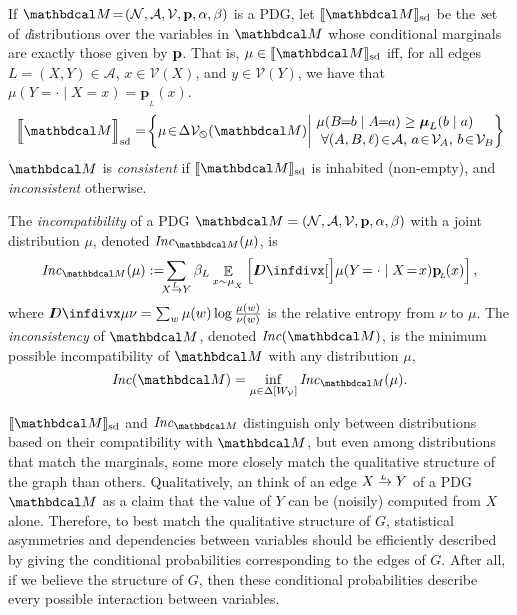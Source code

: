 \documentclass{article}
\newcommand{\bp}[1][L]{\mathbf{p}_{\!_#1\!}}
\newcommand{\V}{\mathcal V}
\newcommand{\Ed}{\mathcal A}
\newcommand{\ed}[3]{#2
	\overset{\smash{\mskip-5mu\raisebox{-1pt}{$\scriptscriptstyle
				#1$}}}{\rightarrow} #3}
\newcommand{\alle}[1][L]{_{ \ed {#1}XY}}
\newcommand{\dg}[1]{\mathbdcal #1}
\DeclarePairedDelimiter{\SD}{\llbracket}{\rrbracket_{\text{sd}}}
\newcommand\Inc{\mathit{Inc}}
\newcommand{\none}{\varobslash}
\begin{document}
	\begin{defn} \label{def:set-semantics} 
		If $\dg M\!=\!\pdgvars[]$ is a PDG, let $\SD{\dg M}$ be the \emph{s}et of \emph{d}istributions over the variables in $\dg M$ whose conditional marginals are exactly those given by $\mathbf p$.
		That is, $\mu \in \SD{\dg M}$ iff, for all edges $L = (X,Y) \in \Ed$,  $x \in \V(X)$,  and $y \in \V(Y)$, we have that $\mu(Y = \cdot \mid X\!=\! x) = \bp(x)$.
		{
			\[ \SD[\Big]{\dg M} = \!\left\{\mu \!\in\! \Delta \V_\none (\dg M) \middle|\!
			\begin{array}{l}
				\mu(B\!\! =\!\!b \mid A\!\!=\!\!a) \geq \boldsymbol\mu_L(b \mid a) \\[0.1em]
				~\text{$\forall (A, B,\ell) \!\in\! \Ed$, $a \!\in\!\mathcal V_A$, $b \!\in\! \mathcal V_B$} \end{array}\!\!\! \right\}\]
		}
		$\dg M$ is \emph{consistent} if $\SD{\dg M}$ is inhabited (non-empty), and \emph{inconsistent} otherwise.
	\end{defn}

\begin{defn}\label{def:inc}
	The \emph{incompatibility} of a PDG $\dg M = \pdgvars[]$ with
	a joint distribution $\mu$, denoted $\Inc_{\dg M}(\mu)$, is  
	\[
	\Inc_{\dg M }( \mu) := 
	\!\!\!\sum \alle \beta_L \E_{x \sim \mu_{_X}}
	\left[\kldiv[\Big]{ \mu(Y\!= \cdot\mid X \!=\! x) }{\bp(x) } \right] ,
	\]
	where $\kldiv{\mu}{\nu} = \sum_{w} \mu(w) \log\frac{\mu(w)}{\nu(w)}$ is the 
	relative entropy from $\nu$ to $\mu$.
%	
			The \emph{inconsistency} of $\dg M$, 
		denoted $\Inc(\dg M)$, is the
		minimum possible incompatibility of $\dg M$ with any
		distribution $\mu$,  
		\[ \Inc(\dg M) = \inf_{ \mu \in \Delta [W_{\cal V}]} \Inc_{\dg M}(\mu) . \]
\end{defn}
$\SD{\dg M}$ and $\Inc_{\dg M}$ distinguish only
between distributions based on their compatibility with
$\dg M$, but even among distributions that match the
marginals, some more closely match the qualitative structure
of the graph than others.  
Qualitatively, an think of an edge $\ed LXY$ of a PDG $\dg M$ as a claim that the value of $Y$ can be (noisily) computed from
$X$ alone.  
Therefore, to best match the qualitative structure of $G$, statistical asymmetries and dependencies between variables should
 be efficiently described by giving the conditional probabilities corresponding to the edges of $G$. After all, if we believe the structure of $G$, then these conditional probabilities describe every possible interaction between variables. 
\end{document}
